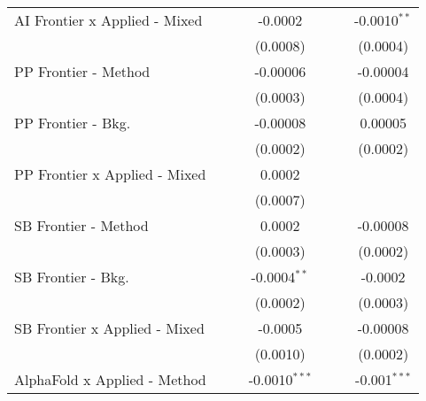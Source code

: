\begin{tabular}{lcccccc}
   AI Frontier x Applied - Mixed  &                 &                 & -0.0002         &                 &                & -0.0010$^{**}$\\   
                                  &                 &                 & (0.0008)        &                 &                & (0.0004)\\   
   PP Frontier - Method           &                 &                 & -0.00006        &                 &                & -0.00004\\   
                                  &                 &                 & (0.0003)        &                 &                & (0.0004)\\   
   PP Frontier - Bkg.             &                 &                 & -0.00008        &                 &                & 0.00005\\   
                                  &                 &                 & (0.0002)        &                 &                & (0.0002)\\   
   PP Frontier x Applied - Mixed  &                 &                 & 0.0002          &                 &                &   \\   
                                  &                 &                 & (0.0007)        &                 &                &   \\   
   SB Frontier - Method           &                 &                 & 0.0002          &                 &                & -0.00008\\   
                                  &                 &                 & (0.0003)        &                 &                & (0.0002)\\   
   SB Frontier - Bkg.             &                 &                 & -0.0004$^{**}$  &                 &                & -0.0002\\   
                                  &                 &                 & (0.0002)        &                 &                & (0.0003)\\   
   SB Frontier x Applied - Mixed  &                 &                 & -0.0005         &                 &                & -0.00008\\   
                                  &                 &                 & (0.0010)        &                 &                & (0.0002)\\   
   AlphaFold x Applied - Method   &                 &                 & -0.0010$^{***}$ &                 &                & -0.001$^{***}$\\   

\end{tabular}
